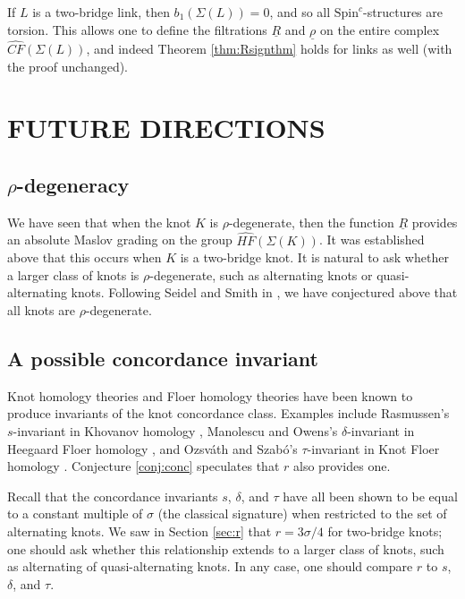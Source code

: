 \documentclass[11pt]{article}
\theoremstyle{plain} \newtheorem{thm}{Theorem}[subsection]
\theoremstyle{plain} \newtheorem{cor}[thm]{Corollary}
\theoremstyle{plain} \newtheorem{prop}[thm]{Proposition}
\theoremstyle{plain} \newtheorem{conj}[thm]{Conjecture}
\theoremstyle{plain} \newtheorem{lem}[thm]{Lemma}
\theoremstyle{definition} \newtheorem{df}[thm]{Definition}
\theoremstyle{remark} \newtheorem{rmk}[thm]{Remark}
\theoremstyle{remark} \newtheorem{obs}[thm]{Observation}
\newcommand{\DBC}[1]{\Sigma(#1)}
\newcommand{\red}[1]{\underline{#1}}
\numberwithin{equation}{section}
\begin{document}
If $L$ is a two-bridge link, then $b_1(\DBC{L}) = 0$, and so all $\text{Spin}^c$-structures are torsion.  This allows one to define the filtrations $\red{R}$ and $\red{\rho}$ on the entire complex $\widehat{CF}(\DBC{L})$, and indeed Theorem \ref{thm:Rsignthm} holds for links as well (with the proof unchanged).


\section{FUTURE DIRECTIONS}

\subsection{$\rho$-degeneracy}
We have seen that when the knot $K$ is $\rho$-degenerate, then the function $\red{R}$ provides an absolute Maslov grading on the group $\widehat{HF}(\DBC{K})$.  It was established above that this occurs when $K$ is a two-bridge knot.  It is natural to ask whether a larger class of knots is $\rho$-degenerate, such as alternating knots or quasi-alternating knots.  Following Seidel and Smith in \cite{ss:R2}, we have conjectured above that all knots are $\rho$-degenerate.

\subsection{A possible concordance invariant}\label{futureconc}

Knot homology theories and Floer homology theories have been known to produce invariants of the knot concordance class.  Examples include Rasmussen's $s$-invariant in Khovanov homology \cite{ras:slice}, Manolescu and Owens's $\delta$-invariant in Heegaard Floer homology \cite{cmo:delta}, and Ozsv\'ath and Szab\'o's $\tau$-invariant in Knot Floer homology \cite{os:4ball}.  Conjecture \ref{conj:conc} speculates that $r$ also provides one.

Recall that the concordance invariants $s$, $\delta$, and $\tau$ have all been shown to be equal to a constant multiple of $\sigma$ (the classical signature) when restricted to the set of alternating knots.  We saw in Section \ref{sec:r} that $r = 3\sigma/4$ for two-bridge knots; one should ask whether this relationship extends to a larger class of knots, such as alternating of quasi-alternating knots.  In any case, one should compare $r$ to $s$, $\delta$, and $\tau$.
\end{document}
